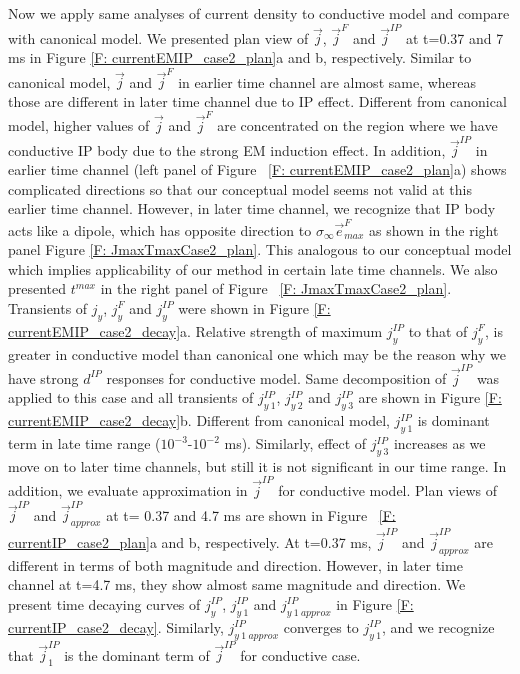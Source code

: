 \documentclass[a4paper, 11pt]{article}
\newcommand{\siginf}{\sigma_\infty}
\renewcommand {\j}  { {\vec j} }
\newcommand {\e}  { {\vec e} }
\begin{document}
Now we apply same analyses of current density to conductive model and compare with canonical model. We presented plan view of $\j$, $\j^{F}$ and $\j^{IP}$ at t=0.37 and 7 ms in Figure \ref{F: currentEMIP_case2_plan}a and b, respectively. Similar to canonical model, $\j$ and $\j^F$ in earlier time channel are almost same, whereas those are different in later time channel due to IP effect. Different from canonical model, higher values of $\j$ and $\j^F$ are concentrated on the region where we have conductive IP body due to the strong EM induction effect. In addition, $\j^{IP}$ in earlier time channel (left panel of Figure ~\ref{F: currentEMIP_case2_plan}a) shows complicated directions so that our conceptual model seems not valid at this earlier time channel. However, in later time channel, we recognize that IP body acts like a dipole, which has opposite direction to $\siginf\e^{F}_{max}$ as shown in the right panel Figure \ref{F: JmaxTmaxCase2_plan}. This analogous to our conceptual model which implies applicability of our method in certain late time channels. We also presented $t^{max}$ in the right panel of Figure ~\ref{F: JmaxTmaxCase2_plan}.
Transients of $j_y$, $j^{F}_y$ and $j^{IP}_y$ were shown in Figure \ref{F: currentEMIP_case2_decay}a. Relative strength of maximum $j^{IP}_y$ to that of $j^{F}_y$, is greater in conductive model than canonical one which may be the reason why we have strong $d^{IP}$ responses for conductive model. Same decomposition of $\j^{IP}$ was applied to this case and all transients of $j^{IP}_{y \ 1}$, $j^{IP}_{y \ 2}$ and $j^{IP}_{y \ 3}$ are shown in Figure \ref{F: currentEMIP_case2_decay}b. Different from canonical model, $j^{IP}_{y \ 1}$ is dominant term in late time range ($10^{-3}$-$10^{-2}$ ms). Similarly, effect of $j^{IP}_{y \ 3}$ increases as we move on to later time channels, but still it is not significant in our time range. In addition, we evaluate approximation in $\j^{IP}$ for conductive model. Plan views of $\j^{IP}$ and $\j^{IP}_{approx}$ at t= 0.37 and 4.7 ms are shown in Figure ~\ref{F: currentIP_case2_plan}a and b, respectively. At t=0.37 ms, $\j^{IP}$ and $\j^{IP}_{approx}$ are different in terms of both magnitude and direction. However, in later time channel at t=4.7 ms, they show almost same magnitude and direction. We present time decaying curves of $j_y^{IP}$, $j_{y \ 1}^{IP}$ and $j_{y \ 1 \ approx}^{IP}$ in Figure \ref{F: currentIP_case2_decay}. Similarly, $j_{y \ 1 \ approx}^{IP}$ converges to $j_{y \ 1}^{IP}$, and we recognize that $\j^{IP}_1$ is the dominant term of $\j^{IP}$ for conductive case.
\end{document}

